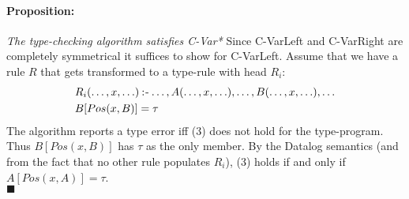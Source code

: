 \paragraph{Proposition: } \textit{The type-checking algorithm satisfies C-Var*}\NL
Since C-VarLeft and C-VarRight are completely symmetrical it suffices to show for C-VarLeft.
Assume that we have a rule $R$ that gets transformed to a type-rule with head $R_i$:
\begin{align*}
&R_i(\ldots, x, \ldots) \mathbin{:\hspace{-0.5ex}\textsf{-}} \ldots, A( \ldots, x, \ldots), \ldots, B(\ldots, x, \ldots), \ldots\\
&B[Pos(x, B)] = \tau
\end{align*}
\noindent
The algorithm reports a type error iff (3) does not hold for the type-program. Thus $B[Pos(x, B)]$ has $\tau$ as the only member.
By the Datalog semantics (and from the fact that no other rule populates $R_i$), (3) holds if and only if $A[Pos(x, A)] = \tau$. \\\hspace*{200pt}$\blacksquare$
\clearpage
